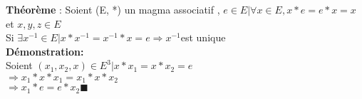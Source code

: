 \documentclass{article}
\begin{document}
\noindent \textbf{Théorème} : Soient (E, *) un magma associatif ,
$e \in E | \forall x \in E, x * e = e * x = x$ et $x, y, z \in E$\\
Si $\exists x^{-1} \in E | x*x^{-1} = x^{-1} * x = e 
\Rightarrow x^{-1} $est unique\\

\noindent \textbf{Démonstration:}\\
Soient $(x_1, x_2, x) \in E^3 | x * x_1 = x * x_2 = e$\\
$\Rightarrow x_1 * x * x_1 = x_1 * x * x_2 $\\
$\Rightarrow x_1 * e = e * x_2 \blacksquare$\\
\end{document}
